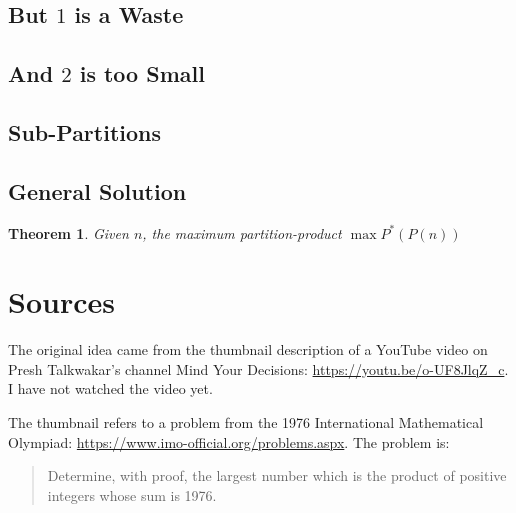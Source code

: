 \documentclass[twocolumn]{article}
\newtheorem{theorem}{Theorem}
\begin{document}
\subsection{But $1$ is a Waste}

\subsection{And $2$ is too Small}

\subsection{Sub-Partitions}



\subsection{General Solution}

\begin{theorem}
  Given $n$, the maximum partition-product $\max{P^*(P(n))}$
\end{theorem}

\section{Sources}

The original idea came from the thumbnail description of a YouTube video on Presh Talkwakar's channel Mind Your Decisions:  \url{https://youtu.be/o-UF8JlqZ_c}.  I have not watched the video yet.

The thumbnail refers to a problem from the 1976 International Mathematical Olympiad:  \url{https://www.imo-official.org/problems.aspx}.  The problem is:
\begin{quote}
  Determine, with proof, the largest number which is the product of positive integers whose sum is 1976.
\end{quote}
\end{document}
